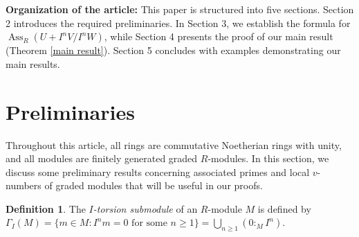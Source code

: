 \documentclass[11pt,reqno]{amsart}
\theoremstyle{definition}
\newtheorem{definition}[theorem]{Definition}
\newcommand{\Ass}{\operatorname{Ass}}
\begin{document}
\textbf{Organization of the article:} 
This paper is structured into five sections. Section 2 introduces the required preliminaries. In Section 3, we establish the formula for $\Ass_R \left(U+I^nV/I^nW\right)$, while Section 4 presents the proof of our main result (Theorem \ref{main result}). Section 5 concludes with examples demonstrating our main results.



\section{Preliminaries}
Throughout this article, all rings are commutative Noetherian rings with unity, and all modules are finitely generated graded $R$-modules. In this section, we discuss some preliminary results concerning associated primes and local $v$-numbers of graded modules that will be useful in our proofs.
\begin{definition}
    The \emph{$I$-torsion submodule} of  an $R$-module $M$ is defined by
$\Gamma_I(M)
=\{m\in M : I^n m=0 \text{ for some } n\geq 1\}
=\bigcup_{n\geq 1}(0:_M I^n).$
\end{definition}
\end{document}
